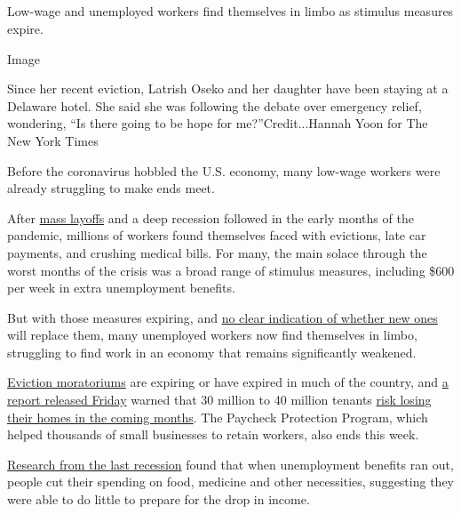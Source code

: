 \hypertarget{section-8}{%
\subsection{}\label{section-8}}

Low-wage and unemployed workers find themselves in limbo as stimulus
measures expire.

Image

Since her recent eviction, Latrish Oseko and her daughter have been
staying at a Delaware hotel. She said she was following the debate over
emergency relief, wondering, ``Is there going to be hope for
me?''Credit...Hannah Yoon for The New York Times

Before the coronavirus hobbled the U.S. economy, many low-wage workers
were already struggling to make ends meet.

After
\href{https://www.nytimes.com/interactive/2020/08/05/upshot/us-unemployment-maps-coronavirus.html}{mass
layoffs} and a deep recession followed in the early months of the
pandemic, millions of workers found themselves faced with evictions,
late car payments, and crushing medical bills. For many, the main solace
through the worst months of the crisis was a broad range of stimulus
measures, including \$600 per week in extra unemployment benefits.

But with those measures expiring, and
\href{https://www.nytimes.com/2020/08/07/us/politics/trump-congress-stimulus.html}{no
clear indication of whether new ones} will replace them, many unemployed
workers now find themselves in limbo, struggling to find work in an
economy that remains significantly weakened.

\href{https://www.nytimes.com/2020/08/07/business/economy/housing-economy-eviction-renters.html}{Eviction
moratoriums} are expiring or have expired in much of the country, and
\href{https://nlihc.org/sites/default/files/The_Eviction_Crisis_080720.pdf}{a
report released Friday} warned that 30 million to 40 million tenants
\href{https://www.nytimes.com/2020/08/07/business/economy/housing-economy-eviction-renters.html}{risk
losing their homes in the coming months}. The Paycheck Protection
Program, which helped thousands of small businesses to retain workers,
also ends this week.

\href{https://www.aeaweb.org/articles?id=10.1257/aer.20170537}{Research
from the last recession} found that when unemployment benefits ran out,
people cut their spending on food, medicine and other necessities,
suggesting they were able to do little to prepare for the drop in
income.

